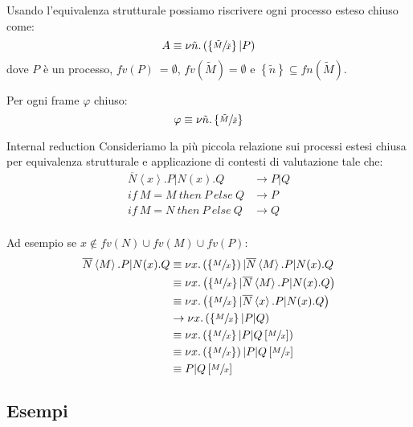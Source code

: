 \documentclass{beamer}
\theoremstyle{plain}
\theoremstyle{definition}
\theoremstyle{remark}
\newcommand{\obar}[1]{\overline{#1}}
\newcommand{\set}[1]{\left\{#1\right\}}
\newcommand{\pa}[1]{\left(#1\right)}
\newcommand{\ang}[1]{\left<#1\right>}
\newcommand{\bra}[1]{\left[#1\right]}
\begin{document}
\begin{frame}
  Usando l'equivalenza strutturale possiamo riscrivere ogni processo
  esteso chiuso come:
  \[ A \equiv \nu \tilde n. \pa{ \set{\sfrac{\tilde M}{\tilde x}} | P
    } \]
  dove $P$ \`e un processo, $fv(P)\ = \emptyset$, $fv(\tilde M) =
  \emptyset$ e $\set{\tilde n} \subseteq fn(\tilde M)$.
  \vfill

  Per ogni frame $\varphi$ chiuso:
  \[ \varphi \equiv \nu \tilde n. \set{\sfrac{\tilde M}{\tilde x}} \]
\end{frame}

\begin{frame}{Internal reduction}
  Consideriamo la pi\`u piccola relazione sui processi estesi chiusa
  per equivalenza strutturale e applicazione di contesti di
  valutazione tale che:
  \begin{align*}
    \obar{N}\ang{x}.P|N(x).Q & \rightarrow P|Q \\
    if\ M=M\ then\ P\ else\ Q & \rightarrow P \\
    if\ M=N\ then\ P\ else\ Q & \rightarrow Q \\
  \end{align*}
\end{frame}

\begin{frame}
    Ad esempio se $x \not\in fv(N)\cup fv(M)\cup fv(P)$:
  \begin{align*}
    \obar{N}\ang{M}.P | N(x).Q & \equiv \nu x. \pa{ \set{\sfrac{M}{x}} } | \obar{N}\ang{M}.P | N(x).Q \\
    & \equiv \nu x. \pa{ \set{\sfrac{M}{x}} | \obar{N}\ang{M}.P | N(x).Q }\\
    & \equiv \nu x.\pa{ \set{\sfrac{M}{x}} | \obar{N} \ang{x}.P | N(x).Q } \\
    & \rightarrow \nu x.\pa{\set{\sfrac{M}{x}}|P|Q} \\
    & \equiv \nu x.\pa{\set{\sfrac{M}{x}}|P|Q\bra{\sfrac{M}{x}}} \\
    & \equiv \nu x.\pa{\set{\sfrac{M}{x}}}|P|Q\bra{\sfrac{M}{x}} \\
    & \equiv P|Q\bra{\sfrac{M}{x}}
  \end{align*}
\end{frame}

\subsection{Esempi}
\end{document}

